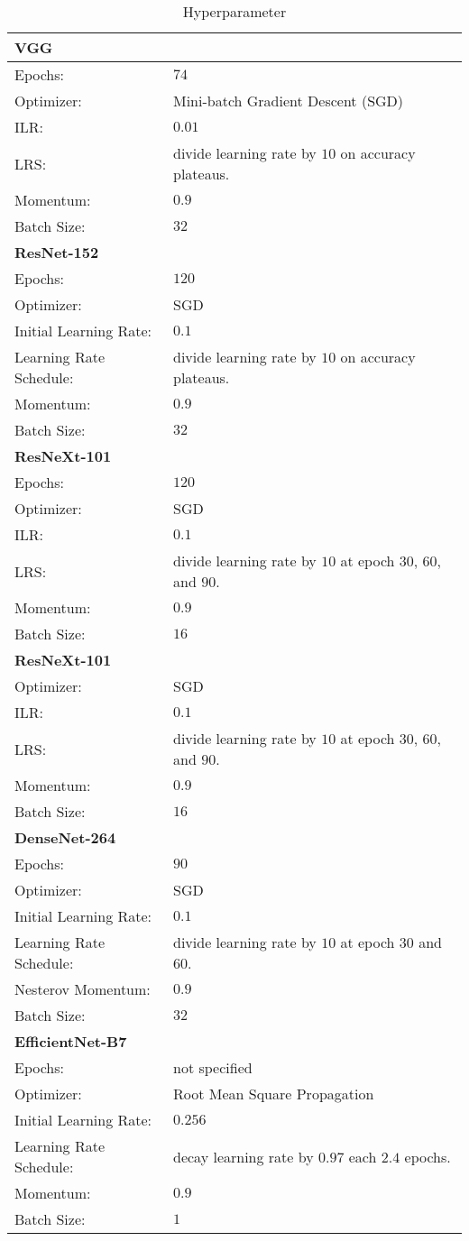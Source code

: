 \begin{table}[h]
	\caption{Hyperparameter} \label{tab:hyp}
	\begin{tabularx}{0.48\textwidth}{lX}
		\toprule
		\textbf{VGG}&\\\midrule
		Epochs: & $74$\\
		Optimizer: & Mini-batch Gradient Descent (SGD)\\
		ILR: & $0.01$\\
		LRS: & divide learning rate by $10$ on accuracy plateaus.\\
		Momentum: & $0.9$\\
		Batch Size: & $32$\\\midrule
		\textbf{ResNet-152}&\\\midrule
		Epochs: & $120$\\
		Optimizer: & SGD\\
		Initial Learning Rate: & $0.1$\\
		Learning Rate Schedule: & divide learning rate by $10$ on accuracy plateaus.\\
		Momentum: & $0.9$\\ 
		Batch Size: & $32$\\\midrule
		\textbf{ResNeXt-101}&\\\midrule
		Epochs: & $120$\\
		Optimizer: & SGD\\
		ILR: & $0.1$\\
		LRS: & divide learning rate by $10$ at epoch $30$, $60$, and $90$.\\
		Momentum: & $0.9$\\ 
		Batch Size: & $16$\\\midrule
		\textbf{ResNeXt-101}&\\\midrule
		Optimizer: & SGD\\
		ILR: & $0.1$\\
		LRS: & divide learning rate by $10$ at epoch $30$, $60$, and $90$.\\
		Momentum: & $0.9$\\ 
		Batch Size: & $16$\\\midrule
		\textbf{DenseNet-264}&\\\midrule
		Epochs: & $90$\\
		Optimizer: & SGD\\
		Initial Learning Rate: & $0.1$\\
		Learning Rate Schedule: & divide learning rate by $10$ at epoch $30$ and $60$.\\
		Nesterov Momentum: & $0.9$\\
		Batch Size: & $32$\\\midrule
		\textbf{EfficientNet-B7}&\\\midrule
		Epochs: & not specified\\
		Optimizer: & Root Mean Square Propagation\\
		Initial Learning Rate: & $0.256$\\
		Learning Rate Schedule: & decay learning rate by $0.97$ each $2.4$ epochs.\\
		Momentum: & $0.9$\\
		Batch Size: & $1$\\
		\bottomrule
	\end{tabularx}
\end{table}
